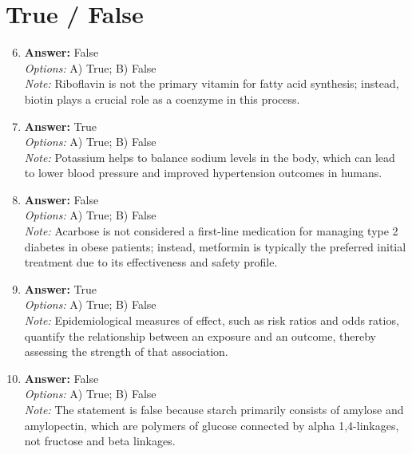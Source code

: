 \documentclass[12pt]{article}
\begin{document}
\section*{True / False}
\begin{enumerate}[label=\arabic*.]
\setcounter{enumi}{5}
\item \textbf{Answer:} False
\\ \textit{Options:} A) True; B) False
\\ \textit{Note:} Riboflavin is not the primary vitamin for fatty acid synthesis; instead, biotin plays a crucial role as a coenzyme in this process.
\item \textbf{Answer:} True
\\ \textit{Options:} A) True; B) False
\\ \textit{Note:} Potassium helps to balance sodium levels in the body, which can lead to lower blood pressure and improved hypertension outcomes in humans.
\item \textbf{Answer:} False
\\ \textit{Options:} A) True; B) False
\\ \textit{Note:} Acarbose is not considered a first-line medication for managing type 2 diabetes in obese patients; instead, metformin is typically the preferred initial treatment due to its effectiveness and safety profile.
\item \textbf{Answer:} True
\\ \textit{Options:} A) True; B) False
\\ \textit{Note:} Epidemiological measures of effect, such as risk ratios and odds ratios, quantify the relationship between an exposure and an outcome, thereby assessing the strength of that association.
\item \textbf{Answer:} False
\\ \textit{Options:} A) True; B) False
\\ \textit{Note:} The statement is false because starch primarily consists of amylose and amylopectin, which are polymers of glucose connected by alpha 1,4-linkages, not fructose and beta linkages.
\end{enumerate}
\end{document}

